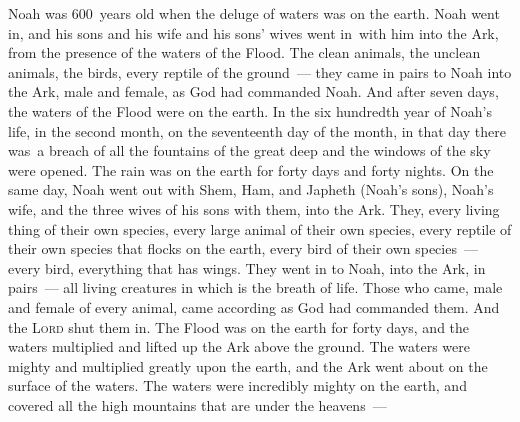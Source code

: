 \begin{inparaenum}
     Noah was 600~years old when the deluge of waters was on the earth.%
     Noah went in, and his sons and his wife and his sons' wives went in\understood\ with him into the Ark, from the presence of the waters of the Flood.%
     The clean animals, the unclean animals, the birds, every reptile of the ground~---%
     they came in pairs to Noah into the Ark, male and female, as God had commanded Noah.%
     And after seven days, the waters of the Flood were on the earth.%
     In the six hundredth year of Noah's life, in the second month, on the seventeenth day of the month, in that day there was\understood\ a breach of all the fountains of the great deep and the windows of the sky were opened.%
     The rain was on the earth for forty days and forty nights.%
     On the same day, Noah went out with Shem, Ham, and Japheth (Noah's sons), Noah's wife, and the three wives of his sons with them, into the Ark.%
     They, every living thing of their own species, every large animal of their own species, every reptile of their own species that flocks on the earth, every bird of their own species~--- every bird, everything that has wings.%
     They went in to Noah, into the Ark, in pairs~--- all living creatures in which is the breath of life.%
     Those who came, male and female of every animal, came according as God had commanded them. And the \textsc{Lord} shut them in.%
     The Flood was on the earth for forty days, and the waters multiplied and lifted up the Ark above the ground.%
     The waters were mighty and multiplied greatly upon the earth, and the Ark went about on the surface of the waters.%
     The waters were incredibly mighty on the earth, and covered all the high mountains that are under the heavens~---%

\end{inparaenum}
